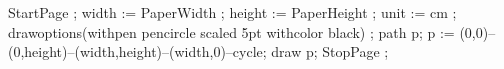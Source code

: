 \setuppapersize[A4,landscape]
\setupcolors[state=start]

\start
\startMPpage
StartPage ;
      width := PaperWidth ; height := PaperHeight ; unit := cm ;
      drawoptions(withpen pencircle scaled 5pt withcolor black) ;
      path p; p := (0,0)--(0,height)--(width,height)--(width,0)--cycle;
      draw p;
StopPage ;
\stopMPpage

\stop

